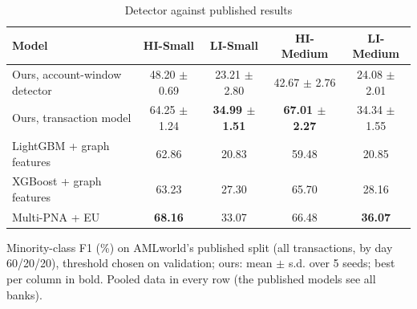 \begin{table}[!t]
\centering
\caption{Detector against published results}
\label{tab:benchmark}
\footnotesize
\setlength{\tabcolsep}{4pt}
\begin{tabular}{lcccc}
\hline
Model & HI-Small & LI-Small & HI-Medium & LI-Medium \\
\hline
Ours, account-window detector & 48.20 $\pm$ 0.69 & 23.21 $\pm$ 2.80 & 42.67 $\pm$ 2.76 & 24.08 $\pm$ 2.01 \\
Ours, transaction model & 64.25 $\pm$ 1.24 & \textbf{34.99 $\pm$ 1.51} & \textbf{67.01 $\pm$ 2.27} & 34.34 $\pm$ 1.55 \\
LightGBM + graph features \cite{altman2023,egressy2024} & 62.86 & 20.83 & 59.48 & 20.85 \\
XGBoost + graph features \cite{altman2023,egressy2024} & 63.23 & 27.30 & 65.70 & 28.16 \\
Multi-PNA + EU \cite{egressy2024} & \textbf{68.16} & 33.07 & 66.48 & \textbf{36.07} \\
\hline
\end{tabular}
\par\smallskip\parbox{\linewidth}{\scriptsize Minority-class F1 (\%) on AMLworld's published split (all transactions, by day 60/20/20), threshold chosen on validation; ours: mean $\pm$ s.d. over 5 seeds; best per column in bold. Pooled data in every row (the published models see all banks).}
\end{table}
